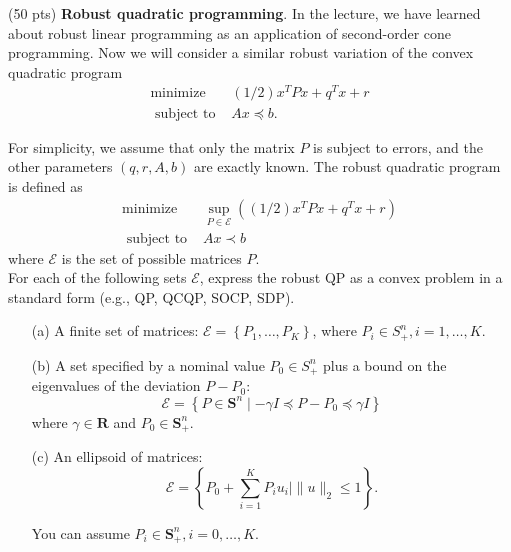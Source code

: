 \item {\color{red} (50 pts)} \textbf{Robust quadratic programming}. In the lecture, we have learned about robust linear programming as an application of second-order cone programming. Now we will consider a similar robust variation of the convex quadratic program
$$
\begin{array}{ll}
\operatorname{minimize} & (1 / 2) x^T P x+q^T x+r \\
\text { subject to } & A x \preceq b .
\end{array}
$$

For simplicity, we assume that only the matrix $P$ is subject to errors, and the other parameters $(q, r, A, b)$ are exactly known. The robust quadratic program is defined as
$$
\begin{array}{cl}
\operatorname{minimize} & \sup _{P \in \mathcal{E}}\left((1 / 2) x^T P x+q^T x+r\right) \\
\text { subject to } & A x \prec b
\end{array}
$$
where $\mathcal{E}$ is the set of possible matrices $P$.\\
For each of the following sets $\mathcal{E}$, express the robust QP as a convex problem in a standard form (e.g., QP, QCQP, SOCP, SDP).
\begin{itemize}
    \item[(a)] A finite set of matrices: $\mathcal{E}=\left\{P_1, \ldots, P_K\right\}$, where $P_i \in S_{+}^n, i=1, \ldots, K$.
    \item[(b)] A set specified by a nominal value $P_0 \in S_{+}^n$ plus a bound on the eigenvalues of the deviation $P-P_0$:
    $$
    \mathcal{E}=\left\{P \in \mathbf{S}^n \mid-\gamma I \preceq P-P_0 \preceq \gamma I\right\}
    $$
    where $\gamma \in \mathbf{R}$ and $P_0 \in \mathbf{S}_{+}^n$.

    \item[(c)] An ellipsoid of matrices:
    $$
    \mathcal{E}=\left\{P_0+\sum_{i=1}^K P_i u_i \mid\|u\|_2 \leq 1\right\} .
    $$

    You can assume $P_i \in \mathbf{S}_{+}^n, i=0, \ldots, K$.
\end{itemize}

\solution{}






\newpage